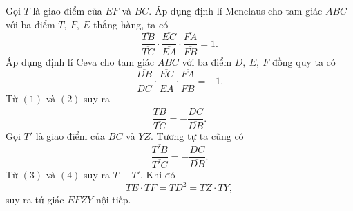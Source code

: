 \begin{bt}
{\begin{center}
\begin{tikzpicture}[scale=1.2]
			\end{tikzpicture}  
		\end{center}
		Gọi $T$ là giao điểm của $EF$ và $BC$. Áp dụng định lí Menelaus cho tam giác $ABC$ với ba điểm $T,\ F,\ E$ thẳng hàng, ta có
		\[\dfrac{\overline{TB}}{\overline{TC}}\cdot \dfrac{\overline{EC}}{\overline{EA}}\cdot \dfrac{\overline{FA}}{\overline{FB}} =1. \tag{1}\] 
		Áp dụng định lí Ceva cho tam giác $ABC$ với ba điểm $D,\ E,\ F$ đồng quy ta có 
		\[\dfrac{\overline{DB}}{\overline{DC}}\cdot \dfrac{\overline{EC}}{\overline{EA}}\cdot \dfrac{\overline{FA}}{\overline{FB}} =-1. \tag{2}\]
		Từ $(1)$ và $(2)$ suy ra 
		\[\dfrac{\overline{TB}}{\overline{TC}}=-\dfrac{\overline{DC}}{\overline{DB}}. \tag{3}\]
		Gọi $T'$ là giao điểm của $BC$ và $YZ$. Tương tự ta cũng có
		\[\dfrac{\overline{T'B}}{\overline{T'C}}=-\dfrac{\overline{DC}}{\overline{DB}}. \tag{4}\]
		Từ $(3)$ và $(4)$ suy ra $T \equiv T'$. Khi đó 
		\[\overline{TE}\cdot \overline{TF} =TD^2= \overline{TZ}\cdot \overline{TY},\]
		suy ra tứ giác $EFZY$ nội tiếp.
	}
\end{bt}

